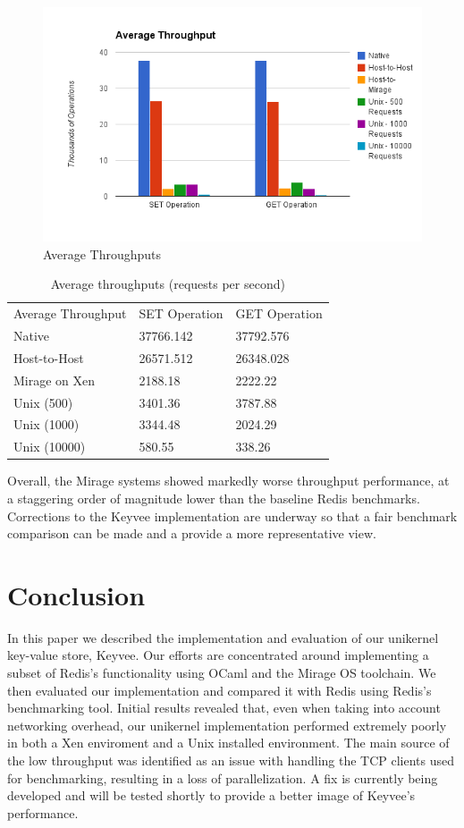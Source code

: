 \documentclass[english,10pt,twocolumn]{article}
\begin{document}
\begin{figure}[ht]
  \centering
  \caption{Average Throughputs}
  \includegraphics[width=1.0\textwidth]{images/throughput}
\end{figure}

\begin{table}[h]
\begin{tabular}{lll}
Average Throughput & SET Operation & GET Operation \\
Native & 37766.142 & 37792.576 \\
Host-to-Host & 26571.512 & 26348.028 \\
Mirage on Xen & 2188.18 & 2222.22 \\
Unix (500) & 3401.36 & 3787.88 \\
Unix (1000) & 3344.48 & 2024.29 \\
Unix (10000) & 580.55 & 338.26
\end{tabular}
\caption{Average throughputs (requests per second)}
\label{my-label}
\end{table}

Overall, the Mirage systems showed markedly worse throughput performance, at a staggering order of magnitude lower than the baseline Redis benchmarks.
Corrections to the Keyvee implementation are underway so that a fair benchmark comparison can be made and a provide a more representative view.

\section{Conclusion}
In this paper we described the implementation and evaluation of our unikernel key-value store, Keyvee.
Our efforts are concentrated around implementing a subset of Redis's functionality using OCaml and the Mirage OS toolchain.
We then evaluated our implementation and compared it with Redis using Redis's benchmarking tool.
Initial results revealed that, even when taking into account networking overhead, our unikernel implementation performed extremely poorly in both a Xen enviroment and a Unix installed environment.
The main source of the low throughput was identified as an issue with handling the TCP clients used for benchmarking, resulting in a loss of parallelization.
A fix is currently being developed and will be tested shortly to provide a better image of Keyvee's performance.
\end{document}
